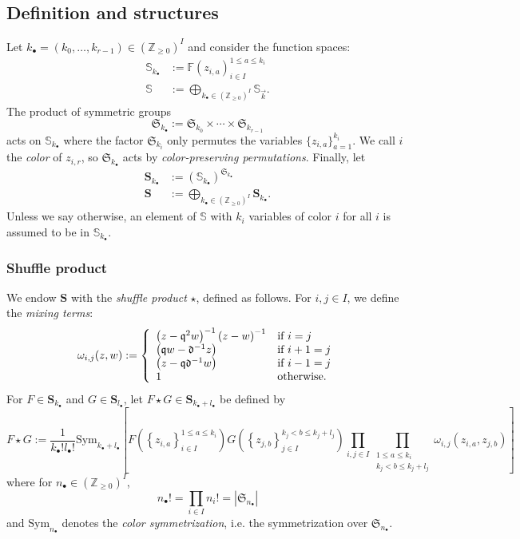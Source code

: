 \documentclass{amsart}
\newcommand{\Z}{\mathbb{Z}}
\newcommand{\F}{\mathbb{F}}
\newcommand{\qqq}{\mathfrak{q}}
\newcommand{\ddd}{\mathfrak{d}}
\newcommand{\Sym}{\mathfrak{S}}
\theoremstyle{remark}
\numberwithin{thm}{section}
\numberwithin{equation}{section}
\begin{document}
\subsection{Definition and structures}
Let $k_\bullet=(k_0,\ldots, k_{r-1})\in\left( \Z_{\ge 0} \right)^I$ and consider the function spaces: 
\begin{align*}
\mathbb{S}_{k_\bullet}&:=\F(z_{i,a})_{i\in I}^{1\le a\le k_i}\\   
\mathbb{S}&:=\bigoplus_{k_\bullet\in\left(\Z_{\ge0}\right)^I}\mathbb{S}_{\vec{k}}.
\end{align*}
The product of symmetric groups
\[
\Sym_{k_\bullet}:=\Sym_{k_0}\times\cdots\times\Sym_{k_{r-1}}
\]
acts on $\mathbb{S}_{k_\bullet}$ where the factor $\Sym_{k_i}$ only permutes the variables $\{z_{i,a}\}_{a=1}^{k_i}$.
We call $i$ the \textit{color} of $z_{i,r}$, so $\Sym_{k_\bullet}$ acts by \textit{color-preserving permutations}.
Finally, let
\begin{align*}
\mathbf{S}_{k_\bullet}&:=\left(\mathbb{S}_{k_\bullet}\right)^{\Sym_{k_\bullet}}\\
\mathbf{S}&:=\bigoplus_{k_\bullet\in\left( \Z_{\ge 0} \right)^I}\mathbf{S}_{k_\bullet}.
\end{align*}
Unless we say otherwise, an element of $\mathbb{S}$ with $k_i$ variables of color $i$ for all $i$ is assumed to be in $\mathbb{S}_{k_\bullet}$.

\subsubsection{Shuffle product}
We endow $\mathbf{S}$ with the \textit{shuffle product} $\star$, defined as follows.
For $i,j\in I$, we define the \textit{mixing terms}:
\[\omega_{i,j}(z,w):=\left\{\begin{array}{ll}
\left(z-\qqq^{2}w\right)^{-1}\left(z-w\right)^{-1} & \hbox{if }i=j\\
\left(\qqq w-\ddd^{-1}z\right) &\hbox{if }i+1=j\\
\left(z-\qqq\ddd^{-1} w\right) &\hbox{if }i-1=j\\
1 &\hbox{otherwise.}
\end{array}\right.\]
For $F\in\mathbf{S}_{k_\bullet}$ and $G\in\mathbf{S}_{l_\bullet}$, let $F\star G\in\mathbf{S}_{k_\bullet+l_\bullet}$ be defined by
\[
F\star G:=\frac{1}{k_\bullet!l_\bullet!}\mathrm{Sym}_{k_\bullet+l_\bullet}\left[ 
F\left( \left\{ z_{i,a} \right\}_{i\in I}^{1\le a\le k_i} \right)G\left( \left\{ z_{j, b} \right\}_{j\in I}^{k_j<b\le k_j+l_j} \right)
\prod_{i,j\in I}\prod_{\substack{1\le a\le k_i\\k_j<b\le k_j+l_j}}\omega_{i,j}(z_{i,a},z_{j,b})
 \right]
\]
where for $n_\bullet\in\left( \Z_{\ge 0} \right)^I$,
\[
n_\bullet!=\prod_{i\in I}n_i!=|\Sym_{n_\bullet}|
\]
and $\mathrm{Sym}_{n_\bullet}$ denotes the \textit{color symmetrization}, i.e. the symmetrization over $\Sym_{n_\bullet}$.
\end{document}
